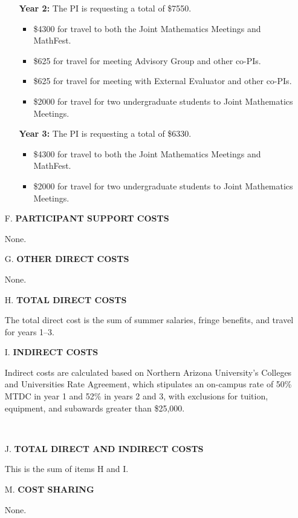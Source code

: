 \documentclass[11pt]{article}
\begin{document}
\begin{enumerate}[leftmargin=*]
\begin{enumerate}
\item[] \textbf{Year 2:} The PI is requesting a total of \$7550.
\begin{itemize}
\item \$4300 for travel to both the Joint Mathematics Meetings and MathFest.
\item \$625 for travel for meeting Advisory Group and other co-PIs.
\item \$625 for travel for meeting with External Evaluator and other co-PIs.
\item \$2000 for travel for two undergraduate students to Joint Mathematics Meetings.
\end{itemize}

\item[] \textbf{Year 3:} The PI is requesting a total of \$6330.
\begin{itemize}
\item \$4300 for travel to both the Joint Mathematics Meetings and MathFest.
\item \$2000 for travel for two undergraduate students to Joint Mathematics Meetings.
\end{itemize} 
\end{enumerate}

\hfill {}

\item[F.] \textbf{PARTICIPANT SUPPORT COSTS}

None. \hfill {}

\item[G.] \textbf{OTHER DIRECT COSTS}

None. \hfill {}

\item[H.] \textbf{TOTAL DIRECT COSTS}

The total direct cost is the sum of summer salaries, fringe benefits, and travel for years 1--3. 

\hfill {}

\item[I.] \textbf{INDIRECT COSTS}

Indirect costs are calculated based on Northern Arizona University's Colleges and Universities Rate Agreement, which stipulates an on-campus rate of 50\% MTDC in year 1 and 52\% in years 2 and 3, with exclusions for tuition, equipment, and subawards greater than \$25,000.

\ \hfill {}

\item[J.] \textbf{TOTAL DIRECT AND INDIRECT COSTS}

This is the sum of items H and I. \hfill {}

\item[M.] \textbf{COST SHARING}

None. \hfill {}

\end{enumerate}
\end{document}
